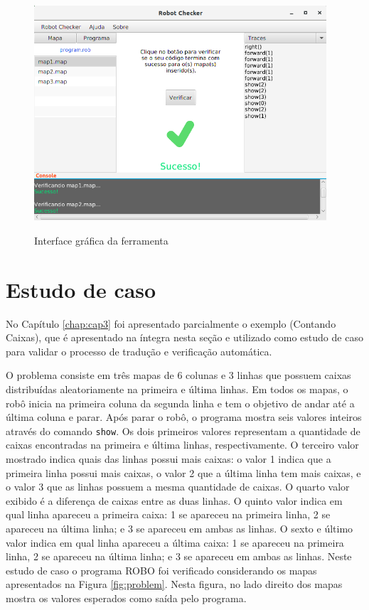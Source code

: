 \begin{figure}[!h]
\centering
\caption{Interface gráfica da ferramenta}
\includegraphics[height=8cm]{figuras/prototipo2.png}
\label{fig:guiprot}
\end{figure}

\section{Estudo de caso}
\label{sec:caso}

No Capítulo \ref{chap:cap3} foi apresentado parcialmente o exemplo (Contando Caixas), que é apresentado na íntegra nesta seção e  utilizado como estudo de caso para validar o processo de tradução e verificação automática.

O problema consiste em três mapas de 6 colunas e 3 linhas que possuem caixas distribuídas aleatoriamente na primeira e última linhas. Em todos os mapas, o robô inicia na primeira coluna da segunda linha e tem o objetivo de andar até a última coluna e parar. Após parar o robô, o programa mostra seis valores inteiros através do comando \texttt{show}. Os dois primeiros valores representam a quantidade de caixas encontradas na primeira e última linhas, respectivamente. O terceiro valor mostrado indica quais das linhas possui mais caixas: o valor 1 indica que a primeira linha possui mais caixas, o valor 2 que a última linha tem mais caixas, e o valor 3 que as linhas possuem a mesma quantidade de caixas. O quarto valor exibido é a diferença de caixas entre as duas linhas. O quinto valor indica em qual linha apareceu a primeira caixa: 1 se apareceu na primeira linha, 2 se apareceu na última linha; e 3 se apareceu em ambas as linhas. O sexto e último valor indica em qual linha apareceu a última caixa: 1 se apareceu na primeira linha, 2 se apareceu na última linha; e 3 se apareceu em ambas as linhas. Neste estudo de caso o programa ROBO foi verificado considerando os mapas apresentados na Figura \ref{fig:problem}. Nesta figura, no lado direito dos mapas mostra os valores esperados como saída pelo programa.

